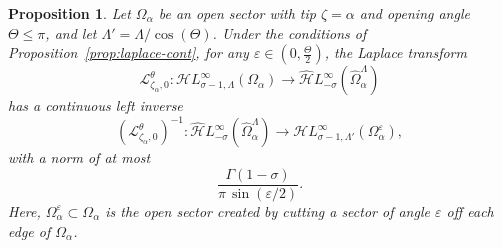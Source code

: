 \documentclass{article}
\newcommand{\singexp}[2]{\mathcal{H}L^\infty_{#1, #2}}
\newcommand{\dualsingexp}[1]{\widehat{\mathcal{H}}L^\infty_{#1}}
\newcommand{\maps}{\colon}
\newcommand{\laplace}{\mathcal{L}}
\theoremstyle{definition}
\theoremstyle{plain}
\newtheorem{prop}[definition]{Proposition}
\begin{document}
\begin{prop}\label{prop:inverse_laplace_analytic}
Let $\Omega_\alpha$ be an open sector with tip $\zeta = \alpha$ and opening angle $\Theta \le \pi$, and let $\Lambda' = \Lambda / \cos(\Theta)$. Under the conditions of Proposition~\ref{prop:laplace-cont}, for any $\varepsilon \in (0, \tfrac{\Theta}{2})$, the Laplace transform
\[ \laplace_{\zeta_\alpha, 0}^\theta \maps \singexp{\sigma-1}{\Lambda}(\Omega_\alpha) \to \dualsingexp{-\sigma}(\widehat{\Omega}_\alpha^\Lambda) \]
has a continuous left inverse
\[ \left(\laplace_{\zeta_\alpha, 0}^\theta\right)^{-1} \maps \dualsingexp{-\sigma}(\widehat{\Omega}_\alpha^\Lambda) \to \singexp{\sigma-1}{\Lambda'}(\Omega_\alpha^\varepsilon), \]
with a norm of at most
\[ \frac{\Gamma(1-\sigma)}{\pi\,\sin(\varepsilon/2)}. \]
Here, $\Omega_\alpha^\varepsilon \subset \Omega_\alpha$ is the open sector created by cutting a sector of angle $\varepsilon$ off each edge of $\Omega_\alpha$.
\end{prop}
\end{document}
